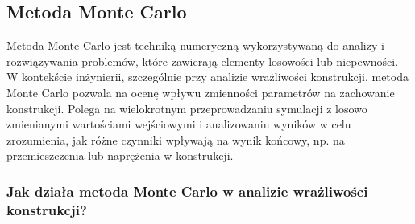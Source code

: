 \subsection{Metoda Monte Carlo}

Metoda Monte Carlo jest techniką numeryczną wykorzystywaną do analizy i rozwiązywania problemów, które zawierają elementy losowości lub niepewności.
W kontekście inżynierii, szczególnie przy analizie wrażliwości konstrukcji, metoda Monte Carlo pozwala na ocenę wpływu zmienności parametrów na zachowanie konstrukcji.
Polega na wielokrotnym przeprowadzaniu symulacji z losowo zmienianymi wartościami wejściowymi i analizowaniu wyników w celu zrozumienia, jak różne czynniki wpływają na wynik końcowy, np. na przemieszczenia lub naprężenia w konstrukcji.

\subsubsection*{Jak działa metoda Monte Carlo w analizie wrażliwości konstrukcji?}
